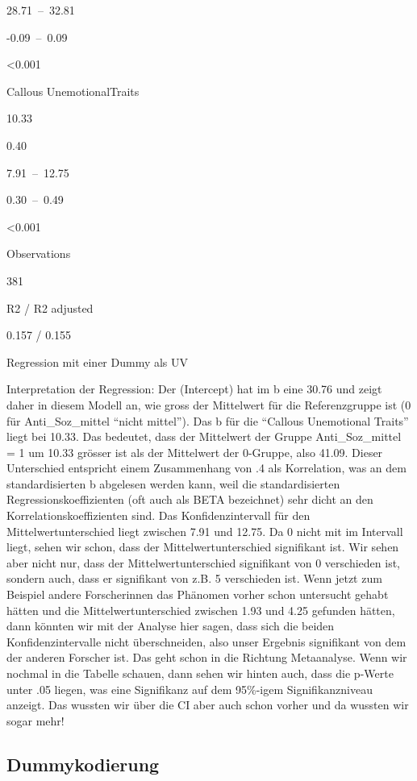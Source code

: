 \documentclass[
  10pt,
  letterpaper,
  a4paper, twoside]{scrreprt}
\begin{document}
28.71~--~32.81

-0.09~--~0.09

\textless0.001

Callous UnemotionalTraits

10.33

0.40

7.91~--~12.75

0.30~--~0.49

\textless0.001

Observations

381

R2 / R2 adjusted

0.157 / 0.155

Regression mit einer Dummy als UV

Interpretation der Regression: Der (Intercept) hat im b eine 30.76 und
zeigt daher in diesem Modell an, wie gross der Mittelwert für die
Referenzgruppe ist (0 für Anti\_Soz\_mittel \enquote{nicht mittel}). Das
b für die \enquote{Callous Unemotional Traits} liegt bei 10.33. Das
bedeutet, dass der Mittelwert der Gruppe Anti\_Soz\_mittel = 1 um 10.33
grösser ist als der Mittelwert der 0-Gruppe, also 41.09. Dieser
Unterschied entspricht einem Zusammenhang von .4 als Korrelation, was an
dem standardisierten b abgelesen werden kann, weil die standardisierten
Regressionskoeffizienten (oft auch als BETA bezeichnet) sehr dicht an
den Korrelationskoeffizienten sind. Das Konfidenzintervall für den
Mittelwertunterschied liegt zwischen 7.91 und 12.75. Da 0 nicht mit im
Intervall liegt, sehen wir schon, dass der Mittelwertunterschied
signifikant ist. Wir sehen aber nicht nur, dass der
Mittelwertunterschied signifikant von 0 verschieden ist, sondern auch,
dass er signifikant von z.B. 5 verschieden ist. Wenn jetzt zum Beispiel
andere Forscherinnen das Phänomen vorher schon untersucht gehabt hätten
und die Mittelwertunterschied zwischen 1.93 und 4.25 gefunden hätten,
dann könnten wir mit der Analyse hier sagen, dass sich die beiden
Konfidenzintervalle nicht überschneiden, also unser Ergebnis signifikant
von dem der anderen Forscher ist. Das geht schon in die Richtung
Metaanalyse. Wenn wir nochmal in die Tabelle schauen, dann sehen wir
hinten auch, dass die p-Werte unter .05 liegen, was eine Signifikanz auf
dem 95\%-igem Signifikanzniveau anzeigt. Das wussten wir über die CI
aber auch schon vorher und da wussten wir sogar mehr!

\subsection{Dummykodierung}\label{dummykodierung}
\end{document}
